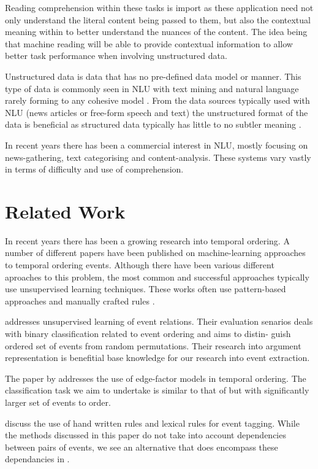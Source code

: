 \documentclass[bsc,frontabs,twoside,singlespacing,parskip,deptreport]{infthesis}     %
\begin{document}
Reading comprehension within these tasks is import as these application need not only understand the literal content
being passed to them, but also the contextual meaning within to better understand the nuances of the content.
The idea being that machine reading will be able to provide contextual information to allow better task performance when
involving unstructured data.

Unstructured data is data that has no pre-defined data model or manner. This type of data is
commonly seen in NLU with text mining and natural language rarely forming to any cohesive model \cite{feldman2007text}.
From the data sources typically used with NLU (news articles or free-form speech and text) the unstructured format of
the data is beneficial as structured data typically has little to no subtler meaning \cite{}.

In recent years there has been a commercial interest in NLU, mostly focusing on news-gathering, text categorising and
content-analysis. These systems vary vastly in terms of difficulty and use of comprehension. 


\section{Related Work}
In recent years there has been a growing research into temporal ordering.
A number of different papers have been published on machine-learning approaches to temporal ordering events.
Although there have been various different aproaches to this problem, the most common and successful approaches typically
use unsupervised learning techniques. These works often use pattern-based approaches and manually crafted rules \cite{chklovski2004mining}.  

\cite{chambers2009unsupervised}addresses unsupervised learning of event relations. Their evaluation
senarios deals with binary classification related to event ordering and aims to distin-
guish ordered set of events from random permutations. Their research into argument representation is benefitial base
knowledge for our research into event extraction.

The paper by \cite{abend2015lexical} addresses the use of
edge-factor models in temporal ordering. The classification task we aim to undertake is similar to that of \cite{abend2015lexical}
but with significantly larger set of events to order.

\cite{mani2006machine} discuss the use of hand written rules and lexical rules for event tagging. While the methods discussed in this paper
do not take into account dependencies between pairs of events, we see an alternative that does encompass
these dependancies in \cite{schapire1998learning}.  
\end{document}
